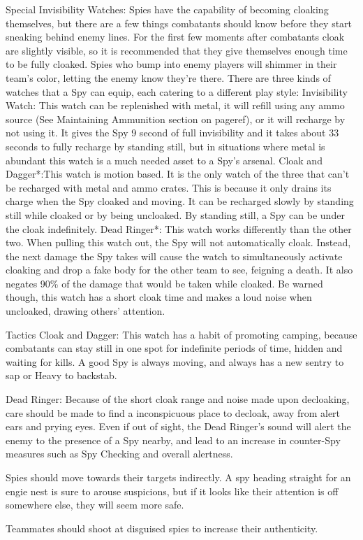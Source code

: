 Special
Invisibility Watches: Spies have the capability of becoming cloaking themselves, but there are a few things combatants should know before they start sneaking behind enemy lines. For the first few moments after combatants cloak are slightly visible, so it is recommended that they give themselves enough time to be fully cloaked. Spies who bump into enemy players will shimmer in their team's color, letting the enemy know they're there. There are three kinds of watches that a Spy can equip, each catering to a different play style:
Invisibility Watch: This watch can be replenished with metal, it will refill using any ammo source (See Maintaining Ammunition section on {{pageref}}), or it will recharge by not using it. It gives the Spy 9 second of full invisibility and it takes about 33 seconds to fully recharge by standing still, but in situations where metal is abundant this watch is a much needed asset to a Spy's arsenal.
Cloak and Dagger*:This watch is motion based. It is the only watch of the three that can't be recharged with metal and ammo crates. This is because it only drains its charge when the Spy cloaked and moving. It can be recharged slowly by standing still while cloaked or by being uncloaked. By standing still, a Spy can be under the cloak indefinitely. 
Dead Ringer*: This watch works differently than the other two. When pulling this watch out, the Spy will not automatically cloak. Instead, the next damage the Spy takes will cause the watch to simultaneously activate cloaking and drop a fake body for the other team to see, feigning a death. It also negates 90\% of the damage that would be taken while cloaked. Be warned though, this watch has a short cloak time and makes a loud noise when uncloaked, drawing others' attention.

Tactics
Cloak and Dagger:  This watch has a habit of promoting camping, because combatants can stay still in one spot for indefinite periods of time, hidden and waiting for kills.  A good Spy is always moving, and always has a new sentry to sap or Heavy to backstab.

Dead Ringer: Because of the short cloak range and noise made upon decloaking, care should be made to find a inconspicuous place to decloak, away from alert ears and prying eyes.  Even if out of sight, the Dead Ringer's sound will alert the enemy to the presence of a Spy nearby, and lead to an increase in counter-Spy measures such as Spy Checking and overall alertness.

Spies should move towards their targets indirectly.  A spy heading straight for an engie nest is sure to arouse suspicions, but if it looks like their attention is off somewhere else, they will seem more safe.

Teammates should shoot at disguised spies to increase their authenticity.  